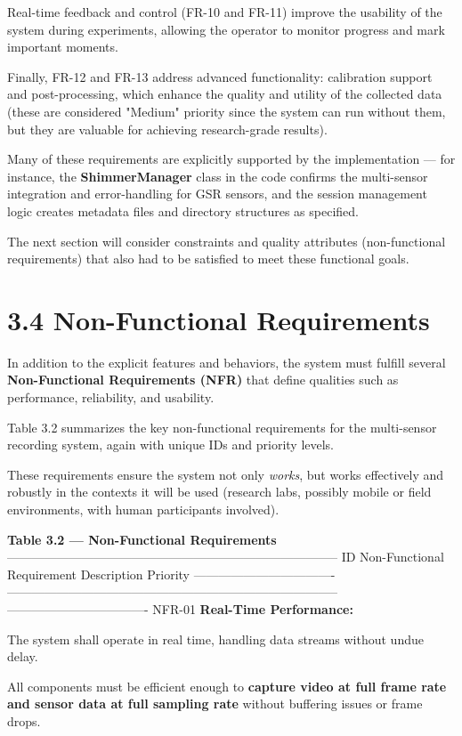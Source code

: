 Real-time feedback and control (FR-10 and FR-11) improve the usability of the
system during experiments, allowing the operator to monitor progress and mark
important moments.

Finally, FR-12 and FR-13 address advanced functionality: calibration support and
post-processing, which enhance the quality and utility of the collected data
(these are considered "Medium" priority since the system can run without them,
but they are valuable for achieving research-grade results).

Many of these requirements are explicitly supported by the implementation --- for instance, the \textbf{ShimmerManager}
class in the code confirms the multi-sensor integration and error-handling for
GSR sensors, and the session management logic creates metadata files and
directory structures as specified.

The next section will consider constraints and quality attributes
(non-functional requirements) that also had to be satisfied to meet these
functional goals.

\section{3.4 Non-Functional Requirements}

In addition to the explicit features and behaviors, the system must fulfill several \textbf{Non-Functional Requirements (NFR)}
 that define qualities such as performance, reliability, and usability.

Table 3.2 summarizes the key non-functional requirements for the multi-sensor
recording system, again with unique IDs and priority levels.

These requirements ensure the system not only \textit{works}, but works effectively and robustly in the contexts it will be used (research labs, possibly mobile or field environments, with human participants involved).

\textbf{Table 3.2 --- Non-Functional Requirements}
-------------------------------------------------------------------------------- ID Non-Functional Requirement Description Priority ---------------------------------- -------------------------------------------------------------------------------- ---------------------------------- NFR-01 \textbf{Real-Time Performance:}

The system shall operate in real time, handling data streams without undue
delay.

All components must be efficient enough to \textbf{capture video at full frame rate and sensor data at full sampling rate}
 without buffering issues or frame drops.

